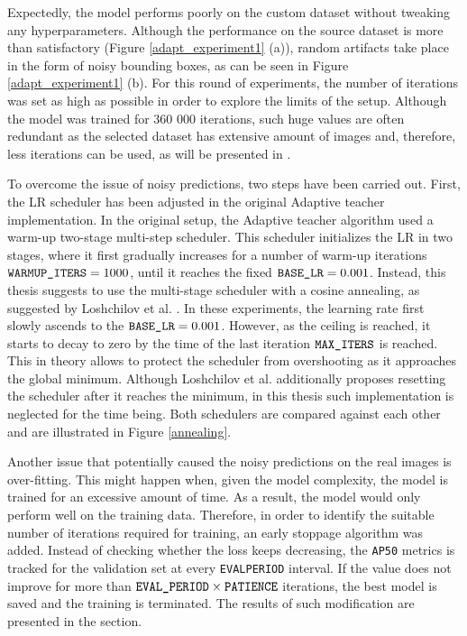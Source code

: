 \documentclass[english, 12pt, a4paper, elec, utf8, a-1b, online]{aaltothesis}
\begin{document}
Expectedly, the model performs poorly on the custom dataset without tweaking any hyperparameters. Although the performance on the source dataset is more than satisfactory (Figure \ref{adapt_experiment1} (a)), random artifacts take place in the form of noisy bounding boxes, as can be seen in Figure \ref{adapt_experiment1} (b). For this round of experiments, the number of iterations was set as high as possible in order to explore the limits of the setup. Although the model was trained for 360 000 iterations, such huge values are often redundant as the selected dataset has extensive amount of images and, therefore, less iterations can be used, as will be presented in . 

To overcome the issue of noisy predictions, two steps have been carried out. First, the LR scheduler has been adjusted in the original Adaptive teacher \cite{Li2021} implementation. In the original setup, the Adaptive teacher algorithm used a warm-up two-stage multi-step scheduler. This scheduler initializes the LR in two stages, where it first gradually increases for a number of warm-up iterations $\texttt{WARMUP\textunderscore ITERS} = 1000$, until it reaches the fixed $\texttt{BASE\textunderscore LR} = 0.001$.  Instead, this thesis suggests to use the multi-stage scheduler with a cosine annealing, as suggested by Loshchilov et al. \cite{Loshchilov2016}. In these experiments, the learning rate first slowly ascends to the $\texttt{BASE\textunderscore LR} = 0.001$. However, as the ceiling is reached, it starts to decay to zero by the time of the last iteration $\texttt{MAX\textunderscore ITERS}$ is reached. This in theory allows to protect the scheduler from overshooting as it approaches the global minimum. Although Loshchilov et al. additionally proposes resetting the scheduler after it reaches the minimum, in this thesis such implementation is neglected for the time being. Both schedulers are compared against each other and are illustrated in Figure \ref{annealing}.

Another issue that potentially caused the noisy predictions on the real images is over-fitting. This might happen when, given the model complexity, the model is trained for an excessive amount of time. As a result, the model would only perform well on the training data. 
Therefore, in order to identify the suitable number of iterations required for training, an early stoppage algorithm was added. Instead of checking whether the loss keeps decreasing, the \texttt{AP50} metrics is tracked for the validation set at every \texttt{EVAL\textunderscore PERIOD} interval. If the value does not improve for more than $\texttt{EVAL\textunderscore PERIOD} \times \texttt{PATIENCE}$ iterations, the best model is saved and the training is terminated. The results of such modification are presented in the  section.  
\end{document}
